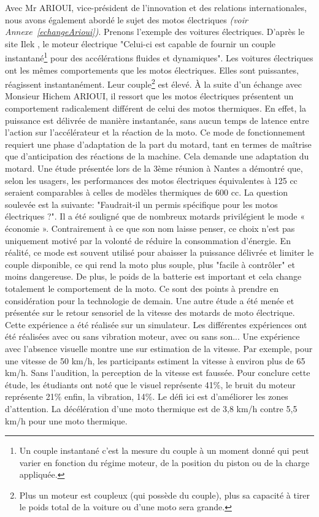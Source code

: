 Avec Mr ARIOUI, vice-président de l’innovation et des relations internationales, nous avons également abordé le sujet des motos électriques \emph{(voir Annexe~\ref{echangeArioui})}. Prenons l'exemple des voitures électriques.
D'après le site Ilek \cite{voiture_electrique}, le moteur électrique "Celui-ci est capable de fournir un couple instantané\footnote{Un couple instantané c’est la mesure du couple à un moment donné qui peut varier en fonction du régime moteur, de la position du piston ou de la charge appliquée.} pour des accélérations fluides et dynamiques". Les voitures électriques ont les mêmes comportements que les motos électriques. Elles sont puissantes, réagissent instantanément. Leur couple\footnote{Plus un moteur est coupleux (qui possède du couple), plus sa capacité à tirer le poids total de la voiture ou d'une moto sera grande.} est élevé.
À la suite d’un échange avec Monsieur Hichem ARIOUI, il ressort que les motos électriques présentent un comportement radicalement différent de celui des motos thermiques. En effet, la puissance est délivrée de manière instantanée, sans aucun temps de latence entre l’action sur l’accélérateur et la réaction de la moto. Ce mode de fonctionnement requiert une phase d’adaptation de la part du motard, tant en termes de maîtrise que d’anticipation des réactions de la machine. Cela demande une adaptation du motard. Une étude présentée lors de la 3ème réunion  \cite{reunionProjet2025} à Nantes a démontré que, selon les usagers, les performances des motos électriques équivalentes à 125 cc seraient comparables à celles de modèles thermiques de 600 cc. La question soulevée est la suivante: "Faudrait-il un permis spécifique pour les motos électriques ?".
Il a été souligné que de nombreux motards privilégient le mode « économie ». Contrairement à ce que son nom laisse penser, ce choix n’est pas uniquement motivé par la volonté de réduire la consommation d'énergie. En réalité, ce mode est souvent utilisé pour abaisser la puissance délivrée et limiter le couple disponible, ce qui rend la moto plus souple, plus "facile à contrôler" et moins dangereuse. 
De plus, le poids de la batterie est important et cela change totalement le comportement de la moto. Ce sont des points à prendre en considération pour la technologie de demain.
Une autre étude a été menée et présentée\cite{reunionProjet2025} sur le retour sensoriel de la vitesse des motards de moto électrique. Cette expérience a été réalisée sur un simulateur. Les différentes expériences ont été réalisées avec ou sans vibration moteur, avec ou sans son... Une expérience avec l'absence visuelle montre une sur estimation de la vitesse. Par exemple, pour une vitesse de 50 km/h, les participants estiment la vitesse à environ plus de 65 km/h. Sans l'audition, la perception de la vitesse est faussée. Pour conclure cette étude, les étudiants ont noté que le visuel représente 41\%, le bruit du moteur représente 21\% enfin, la vibration, 14\%. Le défi ici est d'améliorer les zones d'attention. La décélération d'une moto thermique est de 3,8 km/h contre 5,5 km/h pour une moto thermique.
\vspace{0.5cm} %

